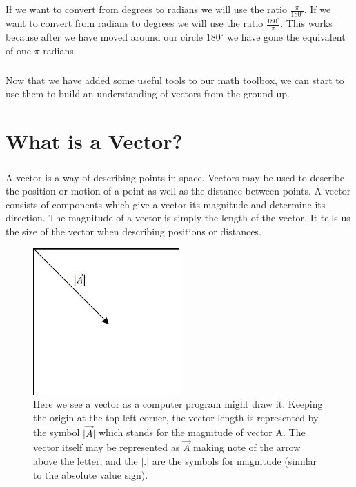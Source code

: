 \documentclass[12pt, letterpaper]{report}
\begin{document}
	\paragraph{} If we want to convert from degrees to radians we will use the ratio $\frac{\pi}{180^{\circ}}$. If we want to convert from radians to degrees we will use the ratio $\frac{180^{\circ}}{\pi}$. This works because after we have moved around our circle $180^{\circ}$ we have gone the equivalent of one $\pi$ radians.
	\paragraph{} Now that we have added some useful tools to our math toolbox, we can start to use them to build an understanding of vectors from the ground up.

\chapter{What is a Vector?}
	\paragraph{}A vector is a way of describing points in space. Vectors may be used to describe the position or motion of a point as well as the distance between points. A vector consists of components which give a vector its magnitude and determine its direction. The magnitude of a vector is simply the length of the vector. It tells us the size of the vector when describing positions or distances. 
	\begin{figure}[h]
	\centering
	\includegraphics[width=0.5\textwidth]{Processing Images/VectorIntro/VectorIntro.jpg}
	\caption{Here we see a vector as a computer program might draw it. Keeping the origin at the top left corner, the vector length is represented by the symbol $\lvert{\vec{A}}\rvert$ which stands for the magnitude of vector A. The vector itself may be represented as $\vec{A}$ making note of the arrow above the letter, and the $\lvert. \rvert$ are the symbols for magnitude (similar to the absolute value sign).}
	\end{figure}
\end{document}
